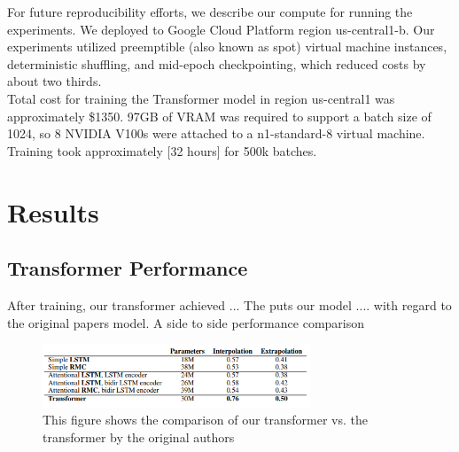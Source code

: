For future reproducibility efforts, we describe our compute for running the experiments. We deployed to Google Cloud Platform region us-central1-b. Our experiments utilized preemptible (also known as spot) virtual machine instances, deterministic shuffling, and mid-epoch checkpointing, which reduced costs by about two thirds. \\

Total cost for training the Transformer model in region us-central1 was approximately \$1350. 97GB of VRAM was required to support a batch size of 1024, so 8 NVIDIA V100s were attached to a n1-standard-8 virtual machine. Training took approximately [32 hours] for 500k batches. \\



\section{Results}

\subsection{Transformer Performance}


After training, our transformer achieved ... The puts our model .... with regard to the original papers model. A side to side performance comparison 


\begin{figure}[h]
\includegraphics[width=8cm]{images/test_image.PNG}
\centering
\caption{This figure shows the comparison of our transformer vs. the transformer by the original authors}

\end{figure}

